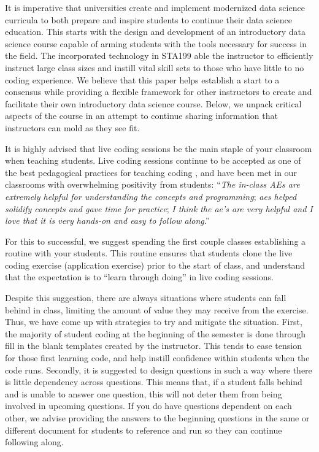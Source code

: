 \documentclass[
  12pt]{article}
\begin{document}
It is imperative that universities create and implement modernized data
science curricula to both prepare and inspire students to continue their
data science education. This starts with the design and development of
an introductory data science course capable of arming students with the
tools necessary for success in the field. The incorporated technology in
STA199 able the instructor to efficiently instruct large class sizes and
instill vital skill sets to those who have little to no coding
experience. We believe that this paper helps establish a start to a
consensus while providing a flexible framework for other instructors to
create and facilitate their own introductory data science course. Below,
we unpack critical aspects of the course in an attempt to continue
sharing information that instructors can mold as they see fit.

It is highly advised that live coding sessions be the main staple of
your classroom when teaching students. Live coding sessions continue to
be accepted as one of the best pedagogical practices for teaching coding
\citep{Selvaraj2021}, and have been met in our classrooms with
overwhelming positivity from students: ``\emph{The in-class AEs are
extremely helpful for understanding the concepts and programming};
\emph{aes helped solidify concepts and gave time for practice}; \emph{I
think the ae's are very helpful and I love that it is very hands-on and
easy to follow along}.''

For this to successful, we suggest spending the first couple classes
establishing a routine with your students. This routine ensures that
students clone the live coding exercise (application exercise) prior to
the start of class, and understand that the expectation is to ``learn
through doing'' in live coding sessions.

Despite this suggestion, there are always situations where students can
fall behind in class, limiting the amount of value they may receive from
the exercise. Thus, we have come up with strategies to try and mitigate
the situation. First, the majority of student coding at the beginning of
the semester is done through fill in the blank templates created by the
instructor. This tends to ease tension for those first learning code,
and help instill confidence within students when the code runs.
Secondly, it is suggested to design questions in such a way where there
is little dependency across questions. This means that, if a student
falls behind and is unable to answer one question, this will not deter
them from being involved in upcoming questions. If you do have questions
dependent on each other, we advise providing the answers to the
beginning questions in the same or different document for students to
reference and run so they can continue following along.
\end{document}
